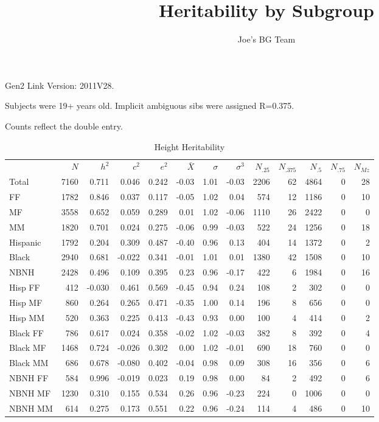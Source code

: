 \documentclass[a4paper]{article}
\title{Heritability by Subgroup}
\author{Joe's BG Team}
\begin{document}
\maketitle
Gen2 Link Version: 2011V28.


Subjects were 19+ years old.  Implicit ambiguous sibs were assigned R=0.375.

Counts reflect the double entry.
\begin{table}[ht]
\begin{center}
\begin{tabular}{lr|rrr|rrr|rrrrr}
  & $N$ & $h^2$ & $c^2$ & $e^2$ & $\bar{X}$ & $\sigma$ & $\sigma^3$ & $N_{.25}$ & $N_{.375}$ & $N_{.5}$ & $N_{.75}$ & $N_{Mz}$ \\ 
 Total & 7160 & 0.711 & 0.046 & 0.242 & -0.03 & 1.01 & -0.03 & 2206 & 62 & 4864 & 0 & 28 \\ 
   \hline
FF & 1782 & 0.846 & 0.037 & 0.117 & -0.05 & 1.02 & 0.04 & 574 & 12 & 1186 & 0 & 10 \\ 
  MF & 3558 & 0.652 & 0.059 & 0.289 & 0.01 & 1.02 & -0.06 & 1110 & 26 & 2422 & 0 & 0 \\ 
  MM & 1820 & 0.701 & 0.024 & 0.275 & -0.06 & 0.99 & -0.03 & 522 & 24 & 1256 & 0 & 18 \\ 
   \hline
Hispanic & 1792 & 0.204 & 0.309 & 0.487 & -0.40 & 0.96 & 0.13 & 404 & 14 & 1372 & 0 & 2 \\ 
  Black & 2940 & 0.681 & -0.022 & 0.341 & -0.01 & 1.01 & 0.01 & 1380 & 42 & 1508 & 0 & 10 \\ 
  NBNH & 2428 & 0.496 & 0.109 & 0.395 & 0.23 & 0.96 & -0.17 & 422 & 6 & 1984 & 0 & 16 \\ 
   \hline
Hisp FF & 412 & -0.030 & 0.461 & 0.569 & -0.45 & 0.94 & 0.24 & 108 & 2 & 302 & 0 & 0 \\ 
  Hisp MF & 860 & 0.264 & 0.265 & 0.471 & -0.35 & 1.00 & 0.14 & 196 & 8 & 656 & 0 & 0 \\ 
  Hisp MM & 520 & 0.363 & 0.225 & 0.413 & -0.43 & 0.93 & 0.00 & 100 & 4 & 414 & 0 & 2 \\ 
   \hline
Black FF & 786 & 0.617 & 0.024 & 0.358 & -0.02 & 1.02 & -0.03 & 382 & 8 & 392 & 0 & 4 \\ 
  Black MF & 1468 & 0.724 & -0.026 & 0.302 & 0.00 & 1.02 & -0.01 & 690 & 18 & 760 & 0 & 0 \\ 
  Black MM & 686 & 0.678 & -0.080 & 0.402 & -0.04 & 0.98 & 0.09 & 308 & 16 & 356 & 0 & 6 \\ 
   \hline
NBNH FF & 584 & 0.996 & -0.019 & 0.023 & 0.19 & 0.98 & 0.00 & 84 & 2 & 492 & 0 & 6 \\ 
  NBNH MF & 1230 & 0.310 & 0.155 & 0.534 & 0.26 & 0.96 & -0.23 & 224 & 0 & 1006 & 0 & 0 \\ 
  NBNH MM & 614 & 0.275 & 0.173 & 0.551 & 0.22 & 0.96 & -0.24 & 114 & 4 & 486 & 0 & 10 \\ 
  \end{tabular}
\caption{Height Heritability}
\label{tab:two}
\end{center}
\end{table}
\end{document}
